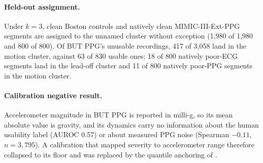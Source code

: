\documentclass[pmlr,twocolumn,10pt]{jmlr}
\begin{document}
\paragraph{Held-out assignment.}
Under $k=3$, clean Boston controls and natively clean MIMIC-III-Ext-PPG segments are assigned to the unnamed cluster without exception (1,980 of 1,980 and 800 of 800). Of BUT PPG's unusable recordings, 417 of 3,058 land in the motion cluster, against 63 of 830 usable ones; 18 of 800 natively poor-ECG segments land in the lead-off cluster and 11 of 800 natively poor-PPG segments in the motion cluster.

\paragraph{Calibration negative result.}
Accelerometer magnitude in BUT PPG is reported in milli-g, so its mean absolute value is gravity, and its dynamics carry no information about the human usability label (AUROC 0.57) or about measured PPG noise (Spearman $-0.11$, $n=3{,}795$). A calibration that mapped severity to accelerometer range therefore collapsed to its floor and was replaced by the quantile anchoring of .
\end{document}
